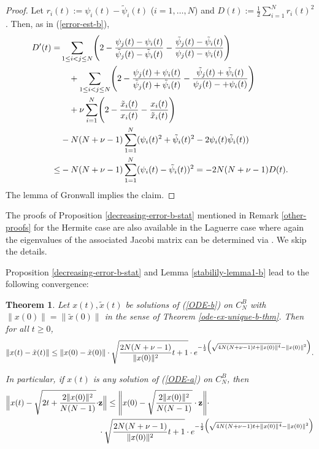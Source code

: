 \documentclass[reqno]{amsart}
\theoremstyle{plain}
\newtheorem{theorem}{Theorem}[section]
\theoremstyle{definition}
\numberwithin{equation}{section}
\begin{document}
 \begin{proof}
   Let $r_i(t):=\psi_i(t)-\tilde \psi_i(t)$ ($i=1,\ldots,N$) and $D(t):=\frac{1}{2}\sum_{i=1}^N r_i(t)^2$. Then, as
   in (\ref{error-est-b}),
\begin{align}
  D^\prime(t) = &\sum_{1\le i< j\le N} \Biggl(2-  \frac{ \psi_j(t) - \psi_i(t)}{\tilde \psi_j(t)-\tilde \psi_i(t)}-
     \frac{\tilde \psi_j(t) -\tilde \psi_i(t)}{\psi_j(t)- \psi_i(t)}
     \Biggr)\notag\\
&\quad+\sum_{1\le i< j\le N} \Biggl(2-  \frac{ \psi_j(t) + \psi_i(t)}{\tilde \psi_j(t)+\tilde \psi_i(t)}-
     \frac{\tilde \psi_j(t) +\tilde \psi_i(t)}{\psi_j(t)-+\psi_i(t)} \Biggr)\notag\\
&\quad +\nu\sum_{i=1}^N \Biggl(2-\frac{\tilde x_i(t)}{ x_i(t)}-\frac{ x_i(t)}{\tilde x_i(t)}\Biggr)\notag\\
     &- N(N+\nu-1)  \sum_{1=1}^N (\psi_i(t)^2 +\tilde\psi_i(t)^2-2\psi_i(t)\tilde\psi_i(t))\notag\\
     \le& - N(N+\nu-1) \sum_{1=1}^N (\psi_i(t)-\tilde\psi_i(t))^2 = -2N(N+\nu-1) D(t).
\notag
   \end{align}
The lemma of Gronwall implies the claim.
 \end{proof}


 The  proofs of Proposition \ref{decreasing-error-b-stat} mentioned in Remark \ref{other-proofs}
 for the Hermite case are also
 available  in the Laguerre case where again the eigenvalues of the associated Jacobi matrix can be determined via \cite{AV2}.
 We skip the details.

 
 Proposition \ref{decreasing-error-b-stat} and 
Lemma \ref{stabilily-lemma1-b} lead to the following convergence:


\begin{theorem}\label{final-convergence-b}
  Let  $x(t),\tilde x(t)$ be solutions of  (\ref{ODE-b}) on $C_N^B$ with
  $\|x(0)\|=\|\tilde x(0)\|$ in the sense of Theorem \ref{ode-ex-unique-b-thm}.
Then for all $t\ge0$,
$$\|x(t)-\tilde x(t)\|\le
\|x(0)-\tilde x(0)\|\cdot\sqrt{\frac{2N(N+\nu-1)}{\|x(0)\|^2}t +1}\cdot  e^{- \frac{1}{2} \Bigl(\sqrt{ 4N(N+\nu-1)t +\|x(0)\|^4}- \|x(0)\|^2\Bigr) }.$$

In particular, if  $x(t)$ is any solution   of   (\ref{ODE-a}) on $C_N^B$, then
\begin{align}
  \Bigl\|x(t)-\sqrt{2t+\frac{2\|x(0)\|^2}{N(N-1)}}\cdot & {\bf z }\Bigr\|\le\Biggl\|x(0)-\sqrt{\frac{2\|x(0)\|^2}{N(N-1)}}\cdot  {\bf z }
\Biggr\|\cdot\\
  &\cdot
\sqrt{\frac{2N(N+\nu-1)}{\|x(0)\|^2}t +1}\cdot  e^{- \frac{1}{2} \Bigl(\sqrt{ 4N(N+\nu-1)t +\|x(0)\|^4}- \|x(0)\|^2\Bigr) }
\notag\end{align}
\end{theorem}
\end{document}

